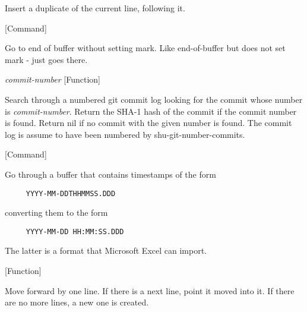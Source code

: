 \begin{doc-string}
Insert a duplicate of the current line, following it.
\end{doc-string}

\vspace{1em}
\noindent
{}
\usebox{\funcname}
 \hfill [Command]

\begin{doc-string}
Go to end of buffer without setting mark.  Like end-of-buffer
but does not set mark - just goes there.
\end{doc-string}

\vspace{1em}
\noindent
{}
\usebox{\funcname}\emph{commit-number}
 \hfill [Function]

\begin{doc-string}
Search through a numbered git commit log looking for the commit whose number is
\emph{commit-number}.  Return the SHA-1 hash of the commit if the commit number is found.
Return nil if no commit with the given number is found.
The commit log is assume to have been numbered by shu-git-number-commits.
\end{doc-string}

\vspace{1em}
\noindent
{}
\usebox{\funcname}
 \hfill [Command]

\begin{doc-string}
Go through a buffer that contains timestamps of the form
\small{\begin{verbatim}
     YYYY-MM-DDTHHMMSS.DDD
\end{verbatim}}
converting them to the form
\small{\begin{verbatim}
     YYYY-MM-DD HH:MM:SS.DDD
\end{verbatim}}
The latter is a format that Microsoft Excel can import.
\end{doc-string}

\vspace{1em}
\noindent
{}
\usebox{\funcname}
 \hfill [Function]

\begin{doc-string}
Move forward by one line.  If there is a next line, point it moved into
it.  If there are no more lines, a new one is created.
\end{doc-string}

